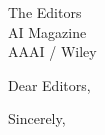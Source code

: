 \documentclass[11pt,a4paper]{letter}
\begin{document}
\begin{letter}{The Editors \\ AI Magazine \\ AAAI / Wiley}

\opening{Dear Editors,}


\closing{Sincerely,}

\end{letter}
\end{document}
